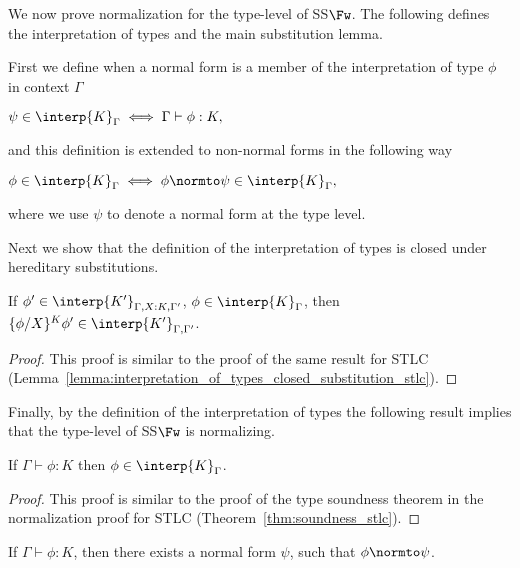 We now prove normalization for the type-level of SS$\Fw$.  The
following defines the interpretation of types and the main
substitution lemma.

\begin{definition}
  \label{def:interpretation_of_types_ssfw}
  First we define when a normal form is a member of the interpretation of type $\phi$ in context $\Gamma$
  \begin{center}
    \begin{math}
      \psi \in \interp{K}_\Gamma \iff \Gamma \vdash \phi:K,
  \end{math}
  \end{center}
  and this definition is extended to non-normal forms in the following way
  \begin{center}
    \begin{math}
      \phi \in \interp{K}_\Gamma \iff \phi \normto \psi \in \interp{K}_\Gamma,
  \end{math}
  \end{center}
 where we use $\psi$ to denote a normal form at the type level.
\end{definition}

\noindent 
Next we show that the definition of the interpretation of types is closed under
hereditary substitutions.  

\begin{lemma}
  If $\phi' \in \interp{K'}_{\Gamma,X:K,\Gamma'}$, $\phi \in \interp{K}_\Gamma$, then 
  $\{\phi/X\}^K \phi' \in \interp{K'}_{\Gamma,\Gamma'}$.
  
  \label{lemma:interpretation_of_types_closed_substitution_ssfw}
\end{lemma}
\begin{proof}
  This proof is similar to the proof of the same result for STLC
  (Lemma~\ref{lemma:interpretation_of_types_closed_substitution_stlc}).
\end{proof}
\noindent
Finally, by the definition of the interpretation of types the following result implies that the type-level
of SS$\Fw$ is normalizing.
\begin{thm}
  If $\Gamma \vdash \phi:K$ then $\phi \in \interp{K}_\Gamma$.
  \label{thm:soundness_ssfw}
\end{thm}
\begin{proof}
  This proof is similar to the proof of the type soundness theorem in
  the normalization proof for STLC (Theorem~\ref{thm:soundness_stlc}).
\end{proof}
\begin{corollary}
  \label{coro:normalization_type_level_ssfw}
  If $\Gamma \vdash \phi:K$, then there exists a normal form $\psi$,
  such that $\phi \normto \psi$.
\end{corollary}

